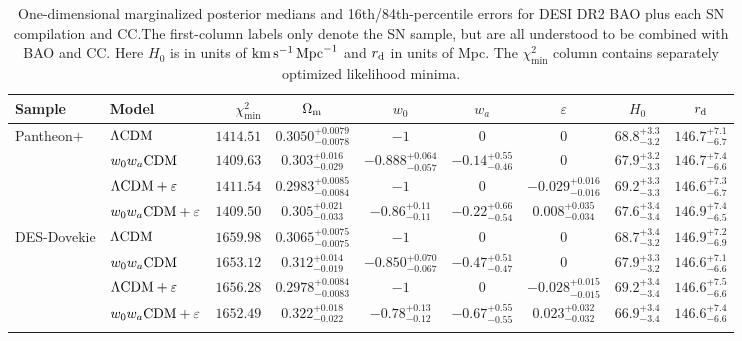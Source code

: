 \begin{table}[t]
\caption{One-dimensional marginalized posterior medians and 16th/84th-percentile errors for DESI DR2 BAO plus each SN compilation and CC.\@ The first-column labels only denote the SN sample, but are all understood to be combined with BAO and CC. Here $H_0$ is in units of ${\rm km}\, {\rm s}^{-1}\, {\rm Mpc}^{-1}$ and $r_{\rm d}$ in units of Mpc. The $\chi_{\min}^2$ column contains separately optimized likelihood minima.}\label{tab:posteriorCC}
\begin{ruledtabular}
\begin{tabular}{llrcccccc}
Sample & Model & $\chi^2_{\min}$ & $\Omega_{\rm m}$ & $w_0$ & $w_a$ & $\varepsilon$ & $H_0$ & $r_{\rm d}$ \\
\hline\rule{0pt}{1.4em}%
Pantheon$+$ & $\Lambda{\rm CDM}$ & $1414.51$ & $0.3050^{+0.0079}_{-0.0078}$ & $-1$ & $0$ & $0$ & $68.8^{+3.3}_{-3.2}$ & $146.7^{+7.1}_{-6.7}$ \\[0.4em]
 & $w_0w_a{\rm CDM}$ & $1409.63$ & $0.303^{+0.016}_{-0.029}$ & $-0.888^{+0.064}_{-0.057}$ & $-0.14^{+0.55}_{-0.46}$ & $0$ & $67.9^{+3.2}_{-3.3}$ & $146.7^{+7.4}_{-6.6}$ \\[0.4em]
 & $\Lambda{\rm CDM} + \varepsilon$ & $1411.54$ & $0.2983^{+0.0085}_{-0.0084}$ & $-1$ & $0$ & $-0.029^{+0.016}_{-0.016}$ & $69.2^{+3.3}_{-3.3}$ & $146.6^{+7.3}_{-6.7}$ \\[0.4em]
 & $w_0w_a{\rm CDM} + \varepsilon$ & $1409.50$ & $0.305^{+0.021}_{-0.033}$ & $-0.86^{+0.11}_{-0.11}$ & $-0.22^{+0.66}_{-0.54}$ & $0.008^{+0.035}_{-0.034}$ & $67.6^{+3.4}_{-3.4}$ & $146.9^{+7.4}_{-6.5}$ \\[0.4em]
\hline\rule{0pt}{1.4em}%
DES-Dovekie & $\Lambda{\rm CDM}$ & $1659.98$ & $0.3065^{+0.0075}_{-0.0075}$ & $-1$ & $0$ & $0$ & $68.7^{+3.4}_{-3.2}$ & $146.9^{+7.2}_{-6.9}$ \\[0.4em]
 & $w_0w_a{\rm CDM}$ & $1653.12$ & $0.312^{+0.014}_{-0.019}$ & $-0.850^{+0.070}_{-0.067}$ & $-0.47^{+0.51}_{-0.47}$ & $0$ & $67.9^{+3.3}_{-3.2}$ & $146.6^{+7.1}_{-6.6}$ \\[0.4em]
 & $\Lambda{\rm CDM} + \varepsilon$ & $1656.28$ & $0.2978^{+0.0084}_{-0.0083}$ & $-1$ & $0$ & $-0.028^{+0.015}_{-0.015}$ & $69.2^{+3.4}_{-3.4}$ & $146.6^{+7.5}_{-6.6}$ \\[0.4em]
 & $w_0w_a{\rm CDM} + \varepsilon$ & $1652.49$ & $0.322^{+0.018}_{-0.022}$ & $-0.78^{+0.13}_{-0.12}$ & $-0.67^{+0.55}_{-0.55}$ & $0.023^{+0.032}_{-0.032}$ & $66.9^{+3.4}_{-3.4}$ & $146.6^{+7.4}_{-6.6}$ \\[0.4em]
\hline\rule{0pt}{1.4em}%

\end{tabular}
\end{ruledtabular}
\end{table}

